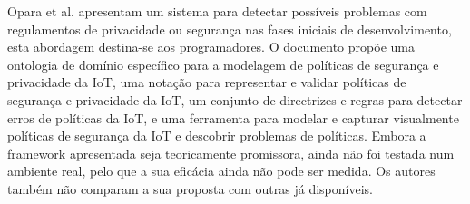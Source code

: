 \documentclass[conference]{IEEEtran}
\begin{document}

Opara et al. \cite{opara2022framework} apresentam um sistema para detectar
possíveis problemas com regulamentos de privacidade ou segurança nas fases
iniciais de desenvolvimento, esta abordagem destina-se aos programadores. O
documento propõe uma ontologia de domínio específico para a modelagem de políticas
de segurança e privacidade da IoT, uma notação para representar e validar políticas
de segurança e privacidade da IoT, um conjunto de directrizes e regras para
detectar erros de políticas da IoT, e uma ferramenta para modelar e capturar
visualmente políticas de segurança da IoT e descobrir problemas de políticas.
Embora a framework apresentada seja teoricamente promissora, ainda não foi
testada num ambiente real, pelo que a sua eficácia ainda não pode ser medida.
Os autores também não comparam a sua proposta com outras já disponíveis.

\end{document}
